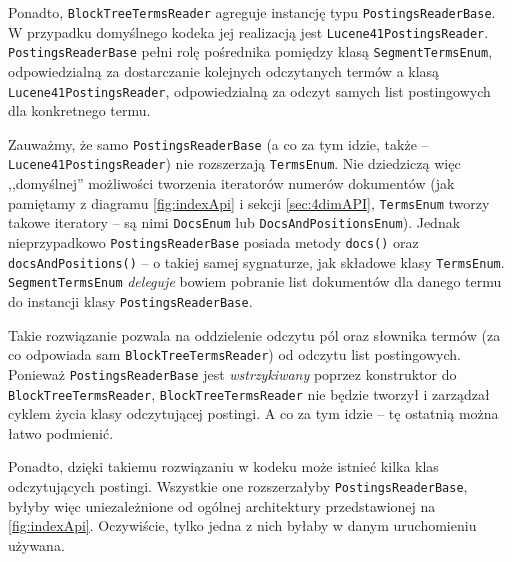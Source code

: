 Ponadto, \texttt{BlockTreeTermsReader} agreguje instancję typu \texttt{PostingsReaderBase}. W przypadku domyślnego kodeka jej realizacją jest \texttt{Lucene41PostingsReader}. \texttt{PostingsReaderBase} pełni rolę pośrednika pomiędzy klasą \texttt{SegmentTermsEnum}, odpowiedzialną za dostarczanie kolejnych odczytanych termów a klasą \texttt{Lucene41PostingsReader}, odpowiedzialną za odczyt samych list postingowych dla konkretnego termu. 

Zauważmy, że samo \texttt{PostingsReaderBase} (a co za tym idzie, także -- \texttt{Lucene41PostingsReader}) nie rozszerzają \texttt{TermsEnum}. Nie dziedziczą więc ,,domyślnej'' możliwości tworzenia iteratorów numerów dokumentów (jak pamiętamy z diagramu \ref{fig:indexApi} i sekcji \ref{sec:4dimAPI}, \texttt{TermsEnum} tworzy takowe iteratory -- są nimi \texttt{DocsEnum} lub \texttt{DocsAndPositionsEnum}). Jednak nieprzypadkowo \texttt{PostingsReaderBase} posiada metody \texttt{docs()} oraz \texttt{docsAndPositions()} -- o takiej samej sygnaturze, jak składowe klasy \texttt{TermsEnum}. \texttt{SegmentTermsEnum} \emph{deleguje} bowiem pobranie list dokumentów dla danego termu do instancji klasy \texttt{PostingsReaderBase}.

Takie rozwiązanie pozwala na oddzielenie odczytu pól oraz słownika termów (za co odpowiada sam \texttt{BlockTreeTermsReader}) od odczytu list postingowych. Ponieważ \texttt{PostingsReaderBase} jest \emph{wstrzykiwany} poprzez konstruktor do \texttt{BlockTreeTermsReader}, \texttt{BlockTreeTermsReader} nie będzie tworzył i zarządzał cyklem życia klasy odczytującej postingi. A co za tym idzie -- tę ostatnią można łatwo podmienić.

Ponadto, dzięki takiemu rozwiązaniu w kodeku może istnieć kilka klas odczytujących postingi. Wszystkie one rozszerzałyby \texttt{PostingsReaderBase}, byłyby więc uniezależnione od ogólnej architektury przedstawionej na \ref{fig:indexApi}. Oczywiście, tylko jedna z nich byłaby w danym uruchomieniu używana.

